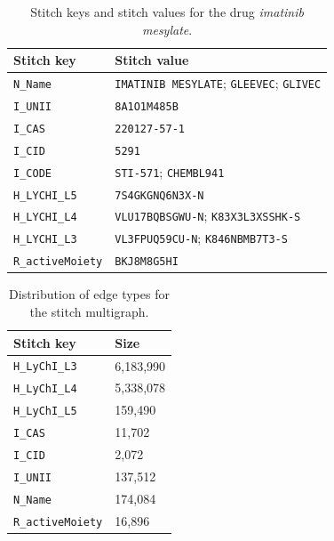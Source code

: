 \documentclass{bmcart}
\begin{document}
\begin{backmatter}
\begin{table}[ht!]
\caption{Stitch keys and stitch values for the
drug \emph{imatinib mesylate}.\label{tab:imatinib}}
\begin{tabular}{@{}ll@{}}\toprule
  Stitch key & Stitch value\\ \midrule
\texttt{N\_Name} & \texttt{IMATINIB MESYLATE}; \texttt{GLEEVEC}; \texttt{GLIVEC}\\
\texttt{I\_UNII} & \texttt{8A1O1M485B}\\
\texttt{I\_CAS} & \texttt{220127-57-1}\\
\texttt{I\_CID} & \texttt{5291}\\
\texttt{I\_CODE} & \texttt{STI-571}; \texttt{CHEMBL941}\\
\texttt{H\_LYCHI\_L5} & \texttt{7S4GKGNQ6N3X-N}\\
\texttt{H\_LYCHI\_L4} & \texttt{VLU17BQBSGWU-N}; \texttt{K83X3L3XSSHK-S}\\
\texttt{H\_LYCHI\_L3} & \texttt{VL3FPUQ59CU-N}; \texttt{K846NBMB7T3-S}\\
\texttt{R\_activeMoiety} & \texttt{BKJ8M8G5HI}\\ \bottomrule
\end{tabular}
\end{table}

\begin{table}[ht!]
\caption{Distribution of edge types for the stitch multigraph.\label{tab:stitch-keys}}
\begin{tabular}{@{}ll@{}}\toprule
  Stitch key & Size\\ \midrule
\texttt{H\_LyChI\_L3}	& 6,183,990 \\
\texttt{H\_LyChI\_L4}	& 5,338,078 \\
\texttt{H\_LyChI\_L5}	& 159,490 \\
\texttt{I\_CAS}	& 11,702 \\
\texttt{I\_CID}	& 2,072 \\
\texttt{I\_UNII} &	137,512 \\
\texttt{N\_Name} & 174,084 \\
\texttt{R\_activeMoiety}	& 16,896 \\ \bottomrule
\end{tabular}
\end{table}


\end{backmatter}
\end{document}
